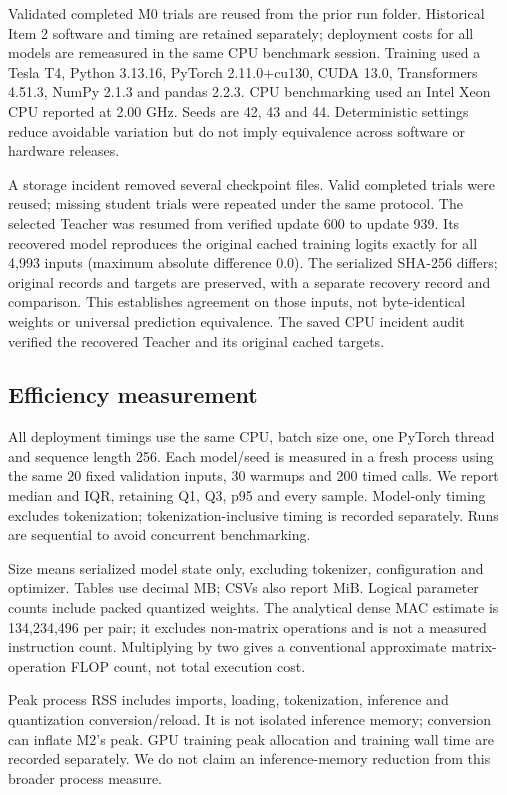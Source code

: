 \documentclass[11pt]{article}
\begin{document}
Validated completed M0 trials are reused from the prior run folder. Historical Item 2 software and timing are retained separately; deployment costs for all models are remeasured in the same CPU benchmark session. Training used a Tesla T4, Python 3.13.16, PyTorch 2.11.0+cu130, CUDA 13.0, Transformers 4.51.3, NumPy 2.1.3 and pandas 2.2.3. CPU benchmarking used an Intel Xeon CPU reported at 2.00 GHz. Seeds are 42, 43 and 44. Deterministic settings reduce avoidable variation but do not imply equivalence across software or hardware releases.

A storage incident removed several checkpoint files. Valid completed trials were reused; missing student trials were repeated under the same protocol. The selected Teacher was resumed from verified update 600 to update 939. Its recovered model reproduces the original cached training logits exactly for all 4,993 inputs (maximum absolute difference 0.0). The serialized SHA-256 differs; original records and targets are preserved, with a separate recovery record and comparison. This establishes agreement on those inputs, not byte-identical weights or universal prediction equivalence. The saved CPU incident audit verified the recovered Teacher and its original cached targets.

\subsection{Efficiency measurement}
All deployment timings use the same CPU, batch size one, one PyTorch thread and sequence length 256. Each model/seed is measured in a fresh process using the same 20 fixed validation inputs, 30 warmups and 200 timed calls. We report median and IQR, retaining Q1, Q3, p95 and every sample. Model-only timing excludes tokenization; tokenization-inclusive timing is recorded separately. Runs are sequential to avoid concurrent benchmarking.

Size means serialized model state only, excluding tokenizer, configuration and optimizer. Tables use decimal MB; CSVs also report MiB. Logical parameter counts include packed quantized weights. The analytical dense MAC estimate is 134,234,496 per pair; it excludes non-matrix operations and is not a measured instruction count. Multiplying by two gives a conventional approximate matrix-operation FLOP count, not total execution cost.

Peak process RSS includes imports, loading, tokenization, inference and quantization conversion/reload. It is not isolated inference memory; conversion can inflate M2's peak. GPU training peak allocation and training wall time are recorded separately. We do not claim an inference-memory reduction from this broader process measure.
\end{document}
